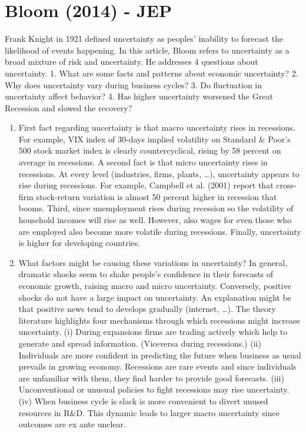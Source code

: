 \documentclass{article}
\begin{document}
{\section{Bloom (2014) - JEP}

Frank Knight in 1921 defined uncertainty as peoples' inability to forecast the likelihood of events happening. In this article, Bloom refers to uncertainty as a broad mixture of risk and uncertainty. He addresses 4 questions about uncertainty. 1. What are some facts and patterns about economic uncertainty? 2. Why does uncertainty vary during business cycles? 3. Do fluctuation in uncertainty affect behavior? 4. Has higher uncertainty worsened the Great Recession and slowed the recovery?

\begin{enumerate}
	
	\item First fact regarding uncertainty is that macro uncertainty rises in recessions. For example, VIX index of 30-days implied volatility on Standard \& Poor's 500 stock market index is clearly countercyclical, rising by 58 percent on average in recessions. A second fact is that micro uncertainty rises in recessions. At every level (industries, firms, plants, \dots), uncertainty appears to rise during recessions. For example, Campbell et al. (2001) report that cross-firm stock-return variation is almost 50 percent higher in recession that booms. Third, since unemployment rises during recession so the volatility of household incomes will rise as well. However, also wages for even those who are employed also become more volatile during recessions. Finally, uncertainty is higher for developing countries.
	
	\item What factors might be causing these variations in uncertainty? In general, dramatic shocks seem to shake people's confidence in their forecasts of economic growth, raising macro and micro uncertainty. Conversely, positive shocks do not have a large impact on uncertainty. An explanation might be that positive news tend to develops gradually (internet, \dots). The theory literature highlights four mechanisms through which recessions might increase uncertainty. (i) During expansions firms are trading actively which help to generate and spread information. (Viceversa during recessions.) (ii) Individuals are more confident in predicting the future when business as usual prevails in growing economy. Recessions are rare events and since individuals are unfamiliar with them, they find harder to provide good forecasts. (iii) Unconventional or unusual policies to fight recessions may rise uncertainty. (iv) When business cycle is slack is more convenient to divert unused resources in R\&D. This dynamic leads to larger macro uncertainty since outcomes are ex ante unclear. 
	

\end{enumerate}}
\end{document}
